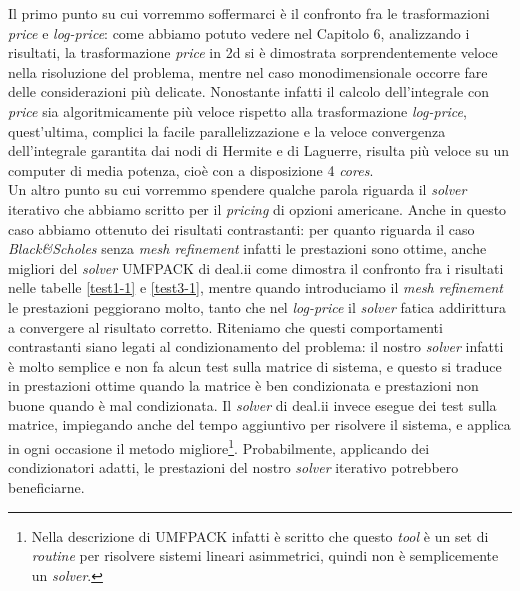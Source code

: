 \documentclass[a4paper,10pt]{report}
\theoremstyle{plain}
\theoremstyle{definition}
\theoremstyle{remark}
\begin{document}
Il primo punto su cui vorremmo soffermarci \`e il confronto fra le trasformazioni \emph{price} e \emph{log-price}: come abbiamo potuto vedere nel Capitolo 6, analizzando i risultati, la trasformazione \emph{price} in 2d si \`e dimostrata sorprendentemente veloce nella risoluzione del problema, mentre nel caso monodimensionale occorre fare delle considerazioni pi\`u delicate. Nonostante infatti il calcolo dell'integrale con \emph{price} sia algoritmicamente pi\`u veloce rispetto alla trasformazione \emph{log-price}, quest'ultima, complici la facile parallelizzazione e la veloce convergenza dell'integrale garantita dai nodi di Hermite e di Laguerre, risulta pi\`u veloce su un computer di media potenza, cio\`e con a disposizione 4 \emph{cores}.\\

Un altro punto su cui vorremmo spendere qualche parola riguarda il \emph{solver} iterativo che abbiamo scritto per il \emph{pricing} di opzioni americane. Anche in questo caso abbiamo ottenuto dei risultati contrastanti: per quanto riguarda il caso \emph{Black\&Scholes} senza \emph{mesh refinement} infatti le prestazioni sono ottime, anche migliori del \emph{solver} \textsf{UMFPACK} di \textsf{deal.ii} come dimostra il confronto fra i risultati nelle tabelle \ref{test1-1} e \ref{test3-1}, mentre quando introduciamo il \emph{mesh refinement} le prestazioni peggiorano molto, tanto che nel \emph{log-price} il \emph{solver} fatica addirittura a convergere al risultato corretto. Riteniamo che questi comportamenti contrastanti siano legati al condizionamento del problema: il nostro \emph{solver} infatti \`e molto semplice e non fa alcun test sulla matrice di sistema, e questo si traduce in prestazioni ottime quando la matrice \`e ben condizionata e prestazioni non buone quando \`e mal condizionata. Il \emph{solver} di \textsf{deal.ii} invece esegue dei test sulla matrice, impiegando anche del tempo aggiuntivo per risolvere il sistema, e applica in ogni occasione il metodo migliore\footnote{Nella descrizione di \textsf{UMFPACK} infatti \`e scritto che questo \emph{tool} \`e un set di \emph{routine} per risolvere sistemi lineari asimmetrici, quindi non \`e semplicemente un \emph{solver}.}. Probabilmente, applicando dei condizionatori adatti, le prestazioni del nostro \emph{solver} iterativo potrebbero beneficiarne.\\
\end{document}
